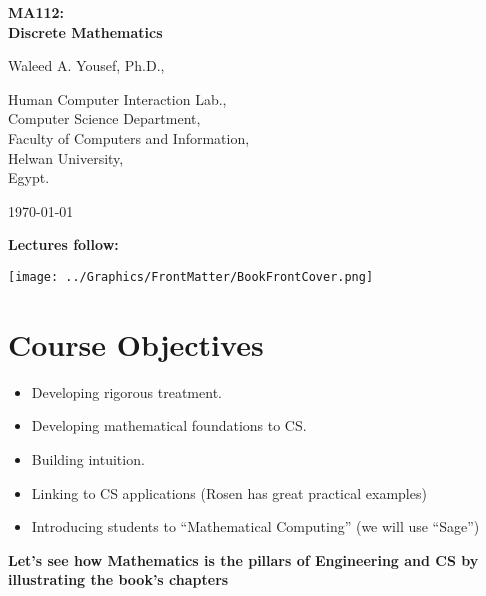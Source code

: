 \begin{titlingpage}
  \begin{center}
    \vspace*{1in}

    \textbf{\large MA112:\\Discrete Mathematics}

\vspace*{1in}

    Waleed A. Yousef, Ph.D.,

    \bigskip

    Human Computer Interaction Lab.,\\Computer Science Department,\\Faculty of Computers and Information,\\Helwan University,\\Egypt.

    \bigskip

    \today
  \end{center}
\end{titlingpage}

\textbf{Lectures follow:}


\begin{center}
  \texttt{[image: ../Graphics/FrontMatter/BookFrontCover.png]}
\end{center}

\chapter*{Course Objectives}

\begin{itemize}
  \item Developing rigorous treatment.
  \item Developing mathematical foundations to CS.
  \item Building intuition.
  \item Linking to CS applications (Rosen has great practical examples)
  \item Introducing students to ``Mathematical Computing'' (we will use ``Sage'')
\end{itemize}

\textbf{Let's see how Mathematics is the pillars of Engineering and CS by illustrating the book's chapters}

\clearpage
{
  \tiny
  \tableofcontents
}


